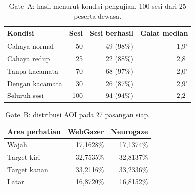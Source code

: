 \documentclass{article}
\begin{document}
\begin{table}[h]
\caption{Gate~A: hasil menurut kondisi pengujian, 100 sesi dari 25 peserta dewasa.}
\label{tab:gatea}
\begin{center}
\small
\begin{tabular}{lrrr}
\toprule
\textbf{Kondisi} & \textbf{Sesi} & \textbf{Sesi berhasil} & \textbf{Galat median} \\
\midrule
Cahaya normal   & 50 & 49 (98\%) & 1,9$^\circ$ \\
Cahaya redup    & 25 & 22 (88\%) & 2,8$^\circ$ \\
Tanpa kacamata  & 70 & 68 (97\%) & 2,0$^\circ$ \\
Dengan kacamata & 30 & 26 (87\%) & 2,9$^\circ$ \\
\midrule
Seluruh sesi    & 100 & 94 (94\%) & 2,2$^\circ$ \\
\bottomrule
\end{tabular}
\end{center}
\end{table}

\begin{table}[h]
\caption{Gate~B: distribusi AOI pada 27 pasangan siap.}
\label{tab:gateb}
\begin{center}
\small
\begin{tabular}{lrr}
\toprule
\textbf{Area perhatian} & \textbf{WebGazer} & \textbf{Neurogaze} \\
\midrule
Wajah              & 17,1628\% & 17,1374\% \\
Target kiri        & 32,7535\% & 32,8137\% \\
Target kanan       & 33,2116\% & 33,2336\% \\
Latar              & 16,8720\% & 16,8152\% \\
\bottomrule
\end{tabular}
\end{center}
\end{table}
\end{document}
